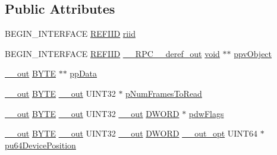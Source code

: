 \subsection*{Public Attributes}
\begin{DoxyCompactItemize}
\item 
B\+E\+G\+I\+N\+\_\+\+I\+N\+T\+E\+R\+F\+A\+CE \hyperlink{px__win__ds_8c_a80ec49c8ae61e234197d5071d2df497d}{R\+E\+F\+I\+ID} \hyperlink{struct_i_audio_capture_client_vtbl_adde7dcf4e05e090fe9b06821531edd4f}{riid}
\item 
B\+E\+G\+I\+N\+\_\+\+I\+N\+T\+E\+R\+F\+A\+CE \hyperlink{px__win__ds_8c_a80ec49c8ae61e234197d5071d2df497d}{R\+E\+F\+I\+ID} \hyperlink{rpcsal_8h_a23bc188526f10656f9c79d950f6c3192}{\+\_\+\+\_\+\+R\+P\+C\+\_\+\+\_\+deref\+\_\+out} \hyperlink{sound_8c_ae35f5844602719cf66324f4de2a658b3}{void} $\ast$$\ast$ \hyperlink{struct_i_audio_capture_client_vtbl_a12a06742a0ff338d0bdc554755ff9724}{ppv\+Object}
\item 
\hyperlink{sal_8h_abb4c3c1135aab6c47cff22e7c16efb74}{\+\_\+\+\_\+out} \hyperlink{mapinls_8h_a4ae1dab0fb4b072a66584546209e7d58}{B\+Y\+TE} $\ast$$\ast$ \hyperlink{struct_i_audio_capture_client_vtbl_a98282ba19bf589f5d2b00595a2006ecc}{pp\+Data}
\item 
\hyperlink{sal_8h_abb4c3c1135aab6c47cff22e7c16efb74}{\+\_\+\+\_\+out} \hyperlink{mapinls_8h_a4ae1dab0fb4b072a66584546209e7d58}{B\+Y\+TE} \hyperlink{sal_8h_abb4c3c1135aab6c47cff22e7c16efb74}{\+\_\+\+\_\+out} U\+I\+N\+T32 $\ast$ \hyperlink{struct_i_audio_capture_client_vtbl_a2ea0f56fbc1dc13df320f4e471dc7502}{p\+Num\+Frames\+To\+Read}
\item 
\hyperlink{sal_8h_abb4c3c1135aab6c47cff22e7c16efb74}{\+\_\+\+\_\+out} \hyperlink{mapinls_8h_a4ae1dab0fb4b072a66584546209e7d58}{B\+Y\+TE} \hyperlink{sal_8h_abb4c3c1135aab6c47cff22e7c16efb74}{\+\_\+\+\_\+out} U\+I\+N\+T32 \hyperlink{sal_8h_abb4c3c1135aab6c47cff22e7c16efb74}{\+\_\+\+\_\+out} \hyperlink{mapinls_8h_ad342ac907eb044443153a22f964bf0af}{D\+W\+O\+RD} $\ast$ \hyperlink{struct_i_audio_capture_client_vtbl_ac94bbd3f09043f13325bfe9378972a27}{pdw\+Flags}
\item 
\hyperlink{sal_8h_abb4c3c1135aab6c47cff22e7c16efb74}{\+\_\+\+\_\+out} \hyperlink{mapinls_8h_a4ae1dab0fb4b072a66584546209e7d58}{B\+Y\+TE} \hyperlink{sal_8h_abb4c3c1135aab6c47cff22e7c16efb74}{\+\_\+\+\_\+out} U\+I\+N\+T32 \hyperlink{sal_8h_abb4c3c1135aab6c47cff22e7c16efb74}{\+\_\+\+\_\+out} \hyperlink{mapinls_8h_ad342ac907eb044443153a22f964bf0af}{D\+W\+O\+RD} \hyperlink{sal_8h_a1ab4597e9d0c9bcc3f676c58b25019fe}{\+\_\+\+\_\+out\+\_\+opt} U\+I\+N\+T64 $\ast$ \hyperlink{struct_i_audio_capture_client_vtbl_adce2c24dcf7a47a805b673fb3fbeb19e}{pu64\+Device\+Position}

\end{DoxyCompactItemize}
